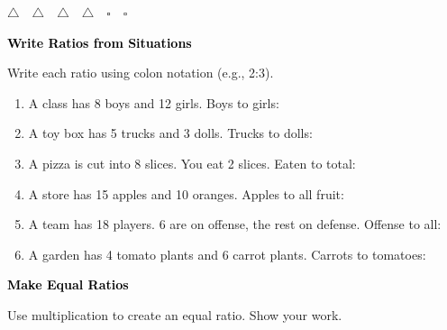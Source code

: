 \documentclass[12pt, letterpaper, fleqn]{article}
\newcommand{\blank}{\underline{\hspace{2.2cm}}}
\begin{document}
\begin{center}
$\triangle \quad \triangle \quad \triangle \quad \triangle \quad \square \quad \square$
\end{center}

\newpage

\begin{tcolorbox}[colback=customteal!20]
\large\textcolor{black}{\textbf{Write Ratios from Situations}}
\end{tcolorbox}

\noindent
Write each ratio using colon notation (e.g., 2:3).

\vspace{3mm}

\begin{enumerate}[itemsep=1.3cm, leftmargin=0.6cm]

\item A class has 8 boys and 12 girls. Boys to girls: \blank

\item A toy box has 5 trucks and 3 dolls. Trucks to dolls: \blank

\item A pizza is cut into 8 slices. You eat 2 slices. Eaten to total: \blank

\item A store has 15 apples and 10 oranges. Apples to all fruit: \blank

\item A team has 18 players. 6 are on offense, the rest on defense. Offense to all: \blank

\item A garden has 4 tomato plants and 6 carrot plants. Carrots to tomatoes: \blank

\end{enumerate}

\newpage

\begin{tcolorbox}[colback=customteal!20]
\large\textcolor{black}{\textbf{Make Equal Ratios}}
\end{tcolorbox}

\noindent
Use multiplication to create an equal ratio. Show your work.

\vspace{3mm}
\end{document}
